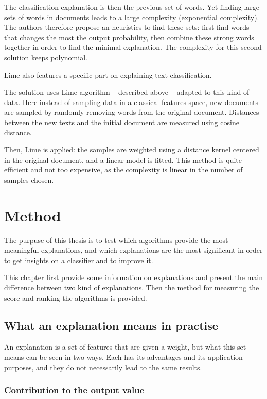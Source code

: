 \documentclass[a4paper,11pt]{kth-mag}
\begin{document}
The classification explanation is then the previous set of words. Yet finding large sets of words in documents leads to a large complexity (exponential complexity). The authors therefore propose an heuristics to find these sets: first find words that changes the most the output probability, then combine these strong words together in order to find the minimal explanation. The complexity for this second solution keeps polynomial.

\vspace{\baselineskip}

Lime \cite{lime} also features a specific part on explaining text classification.

The solution uses Lime algorithm -- described above -- adapted to this kind of data. Here instead of sampling data in a classical features space, new documents are sampled by randomly removing words from the original document. Distances between the new texts and the initial document are measured using cosine distance.

Then, Lime is applied: the samples are weighted using a distance kernel centered in the original document, and a linear model is fitted. This method is quite efficient and not too expensive, as the complexity is linear in the number of samples chosen.

\chapter{Method}

The purpuse of this thesis is to test which algorithms provide the most meaningful explanations, and which explanations are the most significant in order to get insights on a classifier and to improve it.

This chapter first provide some information on explanations and present the main difference between two kind of explanations. Then the method for measuring the score and ranking the algorithms is provided.

\section{What an explanation means in practise}

An explanation is a set of features that are given a weight, but what this set means can be seen in two ways. Each has its advantages and its application purposes, and they do not necessarily lead to the same results.

\subsection{Contribution to the output value}
\end{document}
